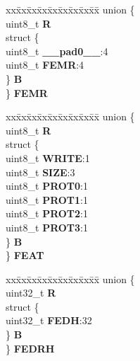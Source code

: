 \begin{DoxyCompactItemize}
\begin{tabbing}
\end{tabbing}\item 
\mbox{\label{structECSM__tag_af2d8970beeb3daeee96eea78f9b37b87}} 
\begin{tabbing}
xx\=xx\=xx\=xx\=xx\=xx\=xx\=xx\=xx\=\kill
union \{\\
\>uint8\_t {\bfseries R}\\
\>struct \{\\
\>\>uint8\_t {\bfseries \_\_pad0\_\_}:4\\
\>\>uint8\_t {\bfseries FEMR}:4\\
\>\} {\bfseries B}\\
\} {\bfseries FEMR}\\

\end{tabbing}\item 
\mbox{\label{structECSM__tag_ab051a180865888dda1c00cbdb0d3fa19}} 
\begin{tabbing}
xx\=xx\=xx\=xx\=xx\=xx\=xx\=xx\=xx\=\kill
union \{\\
\>uint8\_t {\bfseries R}\\
\>struct \{\\
\>\>uint8\_t {\bfseries WRITE}:1\\
\>\>uint8\_t {\bfseries SIZE}:3\\
\>\>uint8\_t {\bfseries PROT0}:1\\
\>\>uint8\_t {\bfseries PROT1}:1\\
\>\>uint8\_t {\bfseries PROT2}:1\\
\>\>uint8\_t {\bfseries PROT3}:1\\
\>\} {\bfseries B}\\
\} {\bfseries FEAT}\\

\end{tabbing}\item 
\mbox{\label{structECSM__tag_a64672145284b33dbce90b182911c2331}} 
\begin{tabbing}
xx\=xx\=xx\=xx\=xx\=xx\=xx\=xx\=xx\=\kill
union \{\\
\>uint32\_t {\bfseries R}\\
\>struct \{\\
\>\>uint32\_t {\bfseries FEDH}:32\\
\>\} {\bfseries B}\\
\} {\bfseries FEDRH}\\


\end{tabbing}
\end{DoxyCompactItemize}
